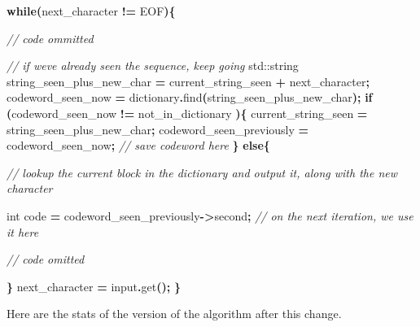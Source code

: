 \documentclass[12pt,twoside]{reedthesis}
\newenvironment{Shaded}{\begin{snugshade}}{\end{snugshade}}
\newcommand{\BuiltInTok}[1]{#1}
\newcommand{\CommentTok}[1]{\textcolor[rgb]{0.56,0.35,0.01}{\textit{#1}}}
\newcommand{\ControlFlowTok}[1]{\textcolor[rgb]{0.13,0.29,0.53}{\textbf{#1}}}
\newcommand{\DataTypeTok}[1]{\textcolor[rgb]{0.13,0.29,0.53}{#1}}
\newcommand{\NormalTok}[1]{#1}
\newcommand{\OperatorTok}[1]{\textcolor[rgb]{0.81,0.36,0.00}{\textbf{#1}}}
\begin{document}
\begin{Shaded}
\begin{Highlighting}[]

    \ControlFlowTok{while}\OperatorTok{(}\NormalTok{next\_character }\OperatorTok{!=}\NormalTok{ EOF}\OperatorTok{)\{}

        \CommentTok{// code ommitted}

        \CommentTok{// if we\textquotesingle{}ve already seen the sequence, keep going}
        \BuiltInTok{std::}\NormalTok{string}\OperatorTok{ }\NormalTok{string\_seen\_plus\_new\_char }\OperatorTok{=}\NormalTok{ current\_string\_seen }\OperatorTok{+}\NormalTok{ next\_character}\OperatorTok{;}
\NormalTok{        codeword\_seen\_now }\OperatorTok{=}\NormalTok{ dictionary}\OperatorTok{.}\NormalTok{find}\OperatorTok{(}\NormalTok{string\_seen\_plus\_new\_char}\OperatorTok{);}
        \ControlFlowTok{if} \OperatorTok{(}\NormalTok{codeword\_seen\_now }\OperatorTok{!=}\NormalTok{ not\_in\_dictionary }\OperatorTok{)\{}
\NormalTok{            current\_string\_seen }\OperatorTok{=}\NormalTok{ string\_seen\_plus\_new\_char}\OperatorTok{;}
\NormalTok{            codeword\_seen\_previously }\OperatorTok{=}\NormalTok{ codeword\_seen\_now}\OperatorTok{;} \CommentTok{// save codeword here}
        \OperatorTok{\}}
        \ControlFlowTok{else}\OperatorTok{\{}

            \CommentTok{// lookup the current block in the dictionary and output it, along with the new character}

            \DataTypeTok{int}\NormalTok{ code }\OperatorTok{=}\NormalTok{ codeword\_seen\_previously}\OperatorTok{{-}\textgreater{}}\NormalTok{second}\OperatorTok{;} \CommentTok{// on the next iteration, we use it here}

            \CommentTok{// code omitted}

        \OperatorTok{\}}
\NormalTok{        next\_character }\OperatorTok{=}\NormalTok{ input}\OperatorTok{.}\NormalTok{get}\OperatorTok{();}
    \OperatorTok{\}}
\end{Highlighting}
\end{Shaded}
Here are the stats of the version of the algorithm after this change.
\end{document}
